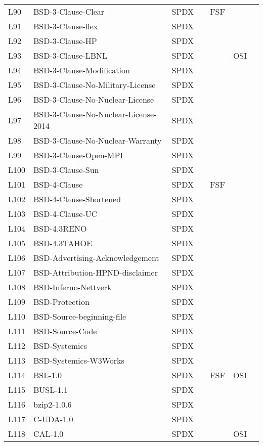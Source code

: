 \begin{longtable}[h]{m{2cm} | m{7cm} | c | c | c | c | c}
  L90 & BSD-3-Clause-Clear & SPDX &  & FSF &  &  \\
  L91 & BSD-3-Clause-flex & SPDX &  &  &  &  \\
  L92 & BSD-3-Clause-HP & SPDX &  &  &  &  \\
  L93 & BSD-3-Clause-LBNL & SPDX &  &  & OSI &  \\
  L94 & BSD-3-Clause-Modification & SPDX &  &  &  &  \\
  L95 & BSD-3-Clause-No-Military-License & SPDX &  &  &  &  \\
  L96 & BSD-3-Clause-No-Nuclear-License & SPDX &  &  &  &  \\
  L97 & BSD-3-Clause-No-Nuclear-License-2014 & SPDX &  &  &  &  \\
  L98 & BSD-3-Clause-No-Nuclear-Warranty & SPDX &  &  &  &  \\
  L99 & BSD-3-Clause-Open-MPI & SPDX &  &  &  &  \\
  L100 & BSD-3-Clause-Sun & SPDX &  &  &  &  \\
  L101 & BSD-4-Clause & SPDX &  & FSF &  &  \\
  L102 & BSD-4-Clause-Shortened & SPDX &  &  &  &  \\
  L103 & BSD-4-Clause-UC & SPDX &  &  &  &  \\
  L104 & BSD-4.3RENO & SPDX &  &  &  &  \\
  L105 & BSD-4.3TAHOE & SPDX &  &  &  &  \\
  L106 & BSD-Advertising-Acknowledgement & SPDX &  &  &  &  \\
  L107 & BSD-Attribution-HPND-disclaimer & SPDX &  &  &  &  \\
  L108 & BSD-Inferno-Nettverk & SPDX &  &  &  &  \\
  L109 & BSD-Protection & SPDX &  &  &  &  \\
  L110 & BSD-Source-beginning-file & SPDX &  &  &  &  \\
  L111 & BSD-Source-Code & SPDX &  &  &  &  \\
  L112 & BSD-Systemics & SPDX &  &  &  &  \\
  L113 & BSD-Systemics-W3Works & SPDX &  &  &  &  \\
  L114 & BSL-1.0 & SPDX &  & FSF & OSI &  \\
  L115 & BUSL-1.1 & SPDX &  &  &  &  \\
  L116 & bzip2-1.0.6 & SPDX &  &  &  &  \\
  L117 & C-UDA-1.0 & SPDX &  &  &  &  \\
  L118 & CAL-1.0 & SPDX &  &  & OSI &  \\

\end{longtable}
